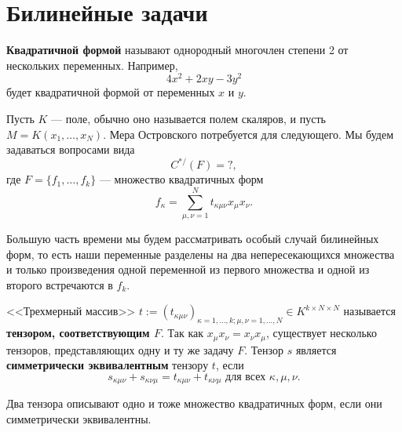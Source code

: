 \section{Билинейные задачи}

\begin{definition}\cite{wiki:qf}
  \textbf{Квадратичной формой} называют однородный многочлен степени 2 от нескольких переменных. Например,
  \[
  	4x^2+2xy-3y^2
  \]
  будет квадратичной формой от переменных $x$ и $y$.
\end{definition}

Пусть $K$ --- поле, обычно оно называется полем скаляров, и пусть $M=K(x_1, \ldots, x_N)$. Мера Островского потребуется для следующего. Мы будем задаваться вопросами вида
\[
	C^{*/}(F)=?,
\]
где $F=\{ f_1, \ldots, f_k \}$ --- множество квадратичных форм
\[
	f_\kappa = \sum\limits_{\mu,\nu=1}^{N} t_{\kappa \mu \nu} x_\mu x_\nu.
\]

Большую часть времени мы будем рассматривать особый случай билинейных форм, то есть наши переменные разделены на два непересекающихся множества и только произведения одной переменной из первого множества и одной из второго встречаются в $f_k$.

<<Трехмерный массив>> $t:=(t_{\kappa \mu \nu})_{\kappa = 1, \ldots, k;  \mu ,\nu = 1, \ldots, N } \in K^{k \times N \times N}$ называется \textbf{тензором, соответствующим $F$}. Так как $x_\mu x_\nu = x_\nu x_\mu$, существует несколько тензоров, представляющих одну и ту же задачу $F$. Тензор $s$ является \textbf{симметрически эквивалентным} тензору $t$, если
\[
	s_{\kappa \mu \nu} + s_{\kappa \nu \mu} = t_{\kappa \mu \nu} + t_{\kappa \nu \mu} \mbox{ для всех } \kappa, \mu, \nu.
\]

Два тензора описывают одно и тоже множество квадратичных форм, если они симметрически эквивалентны.



